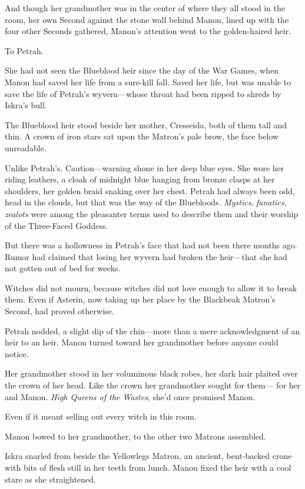 And though her grandmother was in the center of where they all stood in the room, her own Second against the stone wall behind Manon, lined up with the four other Seconds gathered, Manon's attention went to the golden-haired heir.

To Petrah.

She had not seen the Blueblood heir since the day of the War Games, when Manon had saved her life from a sure-kill fall.
Saved her life, but was unable to save the life of Petrah's wyvern---whose throat had been ripped to shreds by Iskra's bull.

The Blueblood heir stood beside her mother, Cresseida, both of them tall and thin.
A crown of iron stars sat upon the Matron's pale brow, the face below unreadable.

Unlike Petrah's.
Caution---warning shone in her deep blue eyes.
She wore her riding leathers, a cloak of midnight blue hanging from bronze clasps at her shoulders, her golden braid snaking over her chest.
Petrah had always been odd, head in the clouds, but that was the way of the Bluebloods.
\emph{Mystics}, \emph{fanatics}, \emph{zealots} were among the pleasanter terms used to describe them and their worship of the Three-Faced Goddess.

But there was a hollowness in Petrah's face that had not been there months ago.
Rumor had claimed that losing her wyvern had broken the heir---that she had not gotten out of bed for weeks.

Witches did not mourn, because witches did not love enough to allow it to break them.
Even if Asterin, now taking up her place by the Blackbeak Matron's Second, had proved otherwise.

Petrah nodded, a slight dip of the chin---more than a mere acknowledgment of an heir to an heir.
Manon turned toward her grandmother before anyone could notice.

Her grandmother stood in her voluminous black robes, her dark hair plaited over the crown of her head.
Like the crown her grandmother sought for them--- for her and Manon.
\emph{High Queens of the Wastes}, she'd once promised Manon.

Even if it meant selling out every witch in this room.

Manon bowed to her grandmother, to the other two Matrons assembled.

Iskra snarled from beside the Yellowlegs Matron, an ancient, bent-backed crone with bits of flesh still in her teeth from lunch.
Manon fixed the heir with a cool stare as she straightened.

